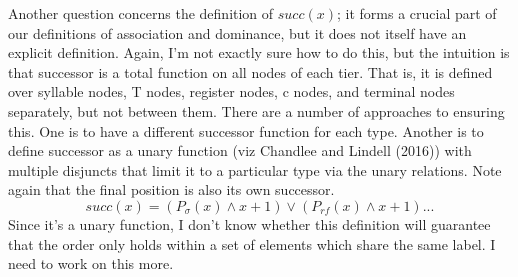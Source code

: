 \documentclass{article}
\begin{document}
\begin{center}
\end{center}
Another question concerns the definition of $succ(x)$; it forms a crucial part of our definitions of association and dominance, but it does not itself have an explicit definition. Again, I'm not exactly sure how to do this, but the intuition is that successor is a total function on all nodes of each tier. That is, it is defined over syllable nodes, T nodes, register nodes, c nodes, and terminal nodes separately, but not between them. There are a number of approaches to ensuring this. One is to have a different successor function for each type. Another is to define successor as a unary function (viz Chandlee and Lindell (2016)) with multiple disjuncts that limit it to a particular type via the unary relations. Note again that the final position is also its own successor.
\begin{equation}
succ(x) = (P_{\sigma}(x)\land x+1) \lor(P_{rf}(x)\land x+1) ...
\end{equation}
Since it's a unary function, I don't know whether this definition will guarantee that the order only holds within a set of elements which share the same label. I need to work on this more.
\end{document}
